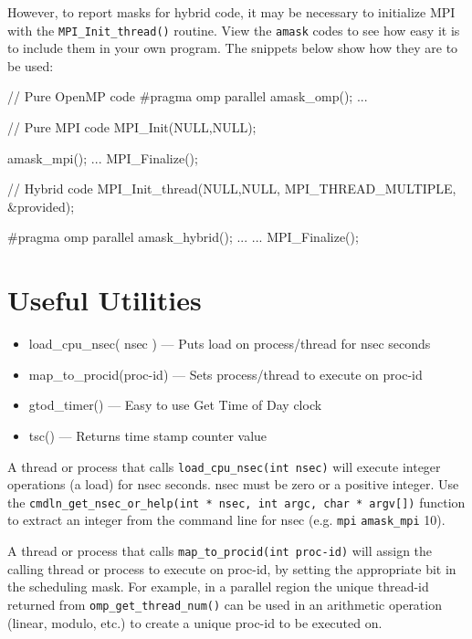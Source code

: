 \documentclass[10pt,a4paper]{report}
\begin{document}
However, to report masks for hybrid code, it may be necessary
to initialize MPI with the \verb+MPI_Init_thread()+ routine. View the \verb+amask+ codes to see how easy
it is to include them in your own program. The snippets below show how they are to be used:



\begin{code}[frame=single,breaklines=true,numbers=left,language=C,caption=Invoking mask report inside code\label{code:apimask}]
 // Pure OpenMP code
    #pragma omp parallel
    {
       amask_omp();
     ...
    }

 // Pure MPI code
    MPI_Init(NULL,NULL);

       amask_mpi();
    ...
    MPI_Finalize();

 // Hybrid code
    MPI_Init_thread(NULL,NULL, MPI_THREAD_MULTIPLE, &provided);

   #pragma omp parallel
   {
      amask_hybrid();
      ...
   }
   ...
   MPI_Finalize();
\end{code}


\section{Useful Utilities}
\begin{itemize}
\item load\_cpu\_nsec( nsec )   --- Puts load on process/thread for nsec seconds
\item map\_to\_procid(proc-id)   --- Sets process/thread to execute on proc-id
\item gtod\_timer()           --- Easy to use Get Time of Day clock
\item tsc() --- Returns time stamp counter value
\end{itemize}

A thread or process that calls \verb+load_cpu_nsec(int nsec)+ will execute integer
operations (a load) for nsec seconds.  nsec must be zero or a positive integer.  Use the
\verb+cmdln_get_nsec_or_help(int * nsec, int argc, char * argv[])+ function to extract an
integer from the command line for nsec (e.g. \verb+mpi+ \verb+amask_mpi+ 10).


A thread or process that calls \verb+map_to_procid(int proc-id)+ will assign the
calling thread or process to execute on proc-id, by setting the appropriate
bit in the scheduling mask.  For example, in a parallel region the unique
thread-id returned from \verb+omp_get_thread_num()+ can be used in an
arithmetic operation (linear, modulo, etc.) to create a unique proc-id to be executed on. 
\end{document}
